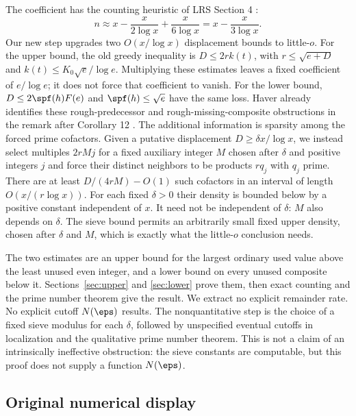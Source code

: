 The coefficient has the counting heuristic of LRS Section 4 \cite{lrs}:
\[
 n\approx x-\frac{x}{2\log x}+\frac{x}{6\log x}
       =x-\frac{x}{3\log x}.
\]
Our new step upgrades two $O(x/\log x)$ displacement bounds to
little-$o$. For the upper bound, the old greedy inequality is
$D\leq2rk(t)$, with $r\leq\sqrt{e+D}$ and
$k(t)\leq K_0\sqrt e/\log e$. Multiplying these estimates leaves a
fixed coefficient of $e/\log e$; it does not force that coefficient
to vanish. For the lower bound,
$D\leq2\spf(h)F(e)$ and $\spf(h)\leq\sqrt e$ have the same loss.
Haver already identifies these rough-predecessor and rough-missing-composite
obstructions in the remark after Corollary 12 \cite{haver}.
The additional information is sparsity among the forced prime cofactors. Given a putative displacement $D\geq\delta x/\log x$, we
instead select multiples $2rMj$ for a fixed auxiliary integer $M$ chosen
after $\delta$ and positive integers $j$ and force their distinct neighbors
to be products $rq_j$ with $q_j$ prime. There are at least
$D/(4rM)-O(1)$ such cofactors in an interval of length
$O(x/(r\log x))$. For each fixed $\delta>0$ their density is bounded
below by a positive constant independent of $x$. It need not be
independent of $\delta$: $M$ also depends on $\delta$. The sieve bound
permits an arbitrarily small fixed upper density, chosen after $\delta$
and $M$, which is exactly what the little-$o$ conclusion needs.

The two estimates are an upper bound for the largest ordinary used
value above the least unused even integer, and a lower bound on every
unused composite below it. Sections~\ref{sec:upper} and
\ref{sec:lower} prove them, then exact counting and the prime number
theorem give the result. We extract no explicit remainder rate. No explicit cutoff $N(\eps)$ results.
The nonquantitative step is the choice of a fixed sieve modulus for
each $\delta$, followed by unspecified eventual cutoffs in localization
and the qualitative prime number theorem. This is not a claim of an
intrinsically ineffective obstruction: the sieve constants are
computable, but this proof does not supply a function $N(\eps)$.

\subsection*{Original numerical display}


